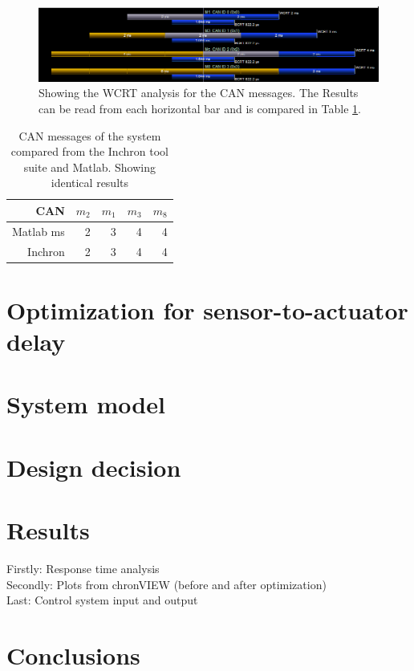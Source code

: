 \begin{figure}[h!]
	\begin{center}
		\includegraphics[width=\linewidth]{img/messagesCANtimings}
		\caption{Showing the WCRT analysis for the CAN messages. The Results can be read from each horizontal bar and is compared in Table \ref{tab:can-rts}.}
		\label{fig:msgCANtiming}
	\end{center}
\end{figure}

\begin{table}[htbp!]
	\centering
	\caption{CAN messages of the system compared from the Inchron tool suite and Matlab. Showing identical results}
	\begin{tabular}{rrrrr}
		\toprule
		CAN     & $m_2$   & $m_1$   & $m_3$   & $m_8$ \\
		\midrule
		Matlab ms & 2       & 3       & 4       & 4 \\
		Inchron & 2       & 3       & 4       & 4 \\
		\bottomrule
	\end{tabular}%
	\label{tab:can-rts}%
\end{table}%



\section{Optimization for sensor-to-actuator delay}



\section{System model}

\section{Design decision}



\section{Results}

Firstly: Response time analysis\\
Secondly: Plots from chronVIEW (before and after optimization)\\
Last: Control system input and output

\section{Conclusions}